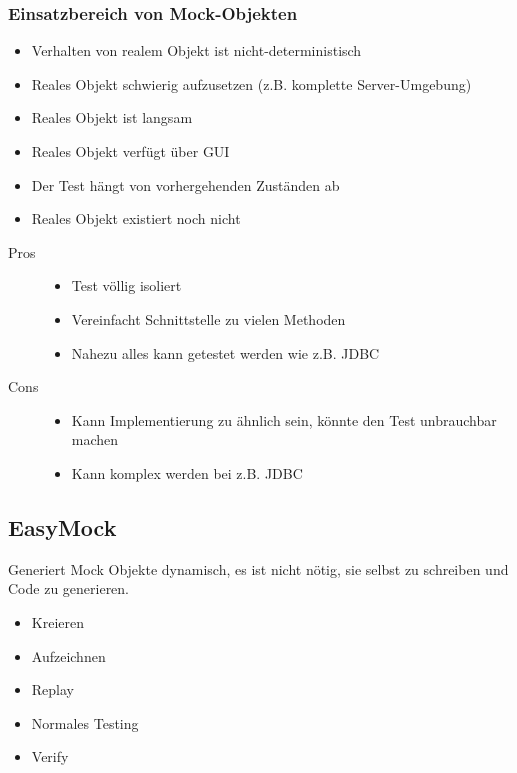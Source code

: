 \documentclass[a4paper,10pt]{article}
\begin{document}
\subsubsection{Einsatzbereich von Mock-Objekten}
\begin{itemize}
	\item Verhalten von realem Objekt ist nicht-deterministisch
	\item Reales Objekt schwierig aufzusetzen (z.B. komplette Server-Umgebung)
	\item Reales Objekt ist langsam
	\item Reales Objekt verfügt über GUI
	\item Der Test hängt von vorhergehenden Zuständen ab
	\item Reales Objekt existiert noch nicht
\end{itemize}
\begin{description}
	\item[Pros] \hfill
		\begin{itemize}
			\item Test völlig isoliert
			\item Vereinfacht Schnittstelle zu vielen Methoden
			\item Nahezu alles kann getestet werden wie z.B. JDBC
		\end{itemize}
	\item[Cons] \hfill
		\begin{itemize}
			\item Kann Implementierung zu ähnlich sein, könnte den Test unbrauchbar machen
			\item Kann komplex werden bei z.B. JDBC
		\end{itemize}
\end{description}

\subsection{EasyMock}

Generiert Mock Objekte dynamisch, es ist nicht nötig, sie selbst zu schreiben und Code zu generieren.
\begin{itemize}
\item Kreieren
\item Aufzeichnen
\item Replay
\item Normales Testing
\item Verify
\end{itemize}
\end{document}
